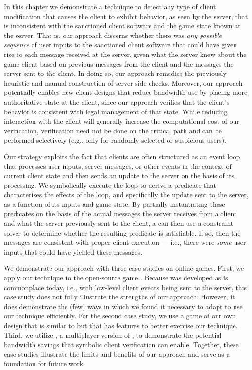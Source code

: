 In this chapter we demonstrate a technique to detect any type of
client modification that causes the client to exhibit behavior, as
seen by the server, that is inconsistent with the sanctioned client
software and the game state known at the server.  That is, our
approach discerns whether there was {\em any possible sequence} of
user inputs to the sanctioned client software that could have given
rise to each message received at the server, given what the server
knew about the game client based on previous messages from the client
and the messages the server sent to the client. In doing so, our
approach remedies the previously heuristic and manual construction of
server-side checks. Moreover, our approach potentially enables new
client designs that reduce bandwidth use by placing more authoritative
state at the client, since our approach verifies that the client's
behavior is consistent with legal management of that state.  While
reducing interaction with the client will generally increase the
computational cost of our verification, verification need not be done
on the critical path and can be performed selectively (e.g., only for
randomly selected or suspicious users).  

Our strategy exploits the fact that clients are often structured
as an event loop that processes user inputs, server messages, or other
events in the context of current client state and then sends an update
to the server on the basis of its processing.  We symbolically execute
the loop to derive a predicate that characterizes the effects of the
loop, and specifically the update sent to the server, as a function of
its inputs and game state.  By partially instantiating these
predicates on the basis of the actual messages the server receives
from a client and what the server previously sent to the client, a
{\em \verifier} can then use a constraint solver to determine whether
the resulting predicate is satisfiable.  If so, then the messages are
consistent with proper client execution --- i.e., there were {\em
  some} user inputs that could have yielded these messages.

We demonstrate our approach with three case studies on online games.
First, we apply our technique to the open-source game \xpilot. Because
\xpilot was developed as is commonplace today, i.e., with low-level
client events being sent to the server, this case study does not fully
illustrate the strengths of our approach.  However, it does
demonstrate the (few) ways in which we found it necessary to adapt
\xpilot to use our technique efficiently.  For the second case study,
we use a game of our own design that is similar to \pacman but that
has features to better exercise our technique.  Third, we utilize
\tetrinet, a multiplayer version of \tetris, to demonstrate the
potential bandwidth savings that symbolic client verification can
enable.  
Together, these case studies illustrate the limits and
benefits of our approach and serve as a foundation for future work.


